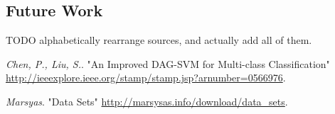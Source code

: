\documentclass{article} %
\begin{document}
\subsection{Future Work}


TODO alphabetically rearrange sources, and actually add all of them.
\begin{thebibliography}{9}
  \emph{Chen, P., Liu, S.}.
  "An Improved DAG-SVM for Multi-class Classification"
  \url{http://ieeexplore.ieee.org/stamp/stamp.jsp?arnumber=0566976}.

  \emph{Marsyas}.
  "Data Sets"
  \url{http://marsysas.info/download/data\_sets}.

\end{thebibliography}
\end{document}
